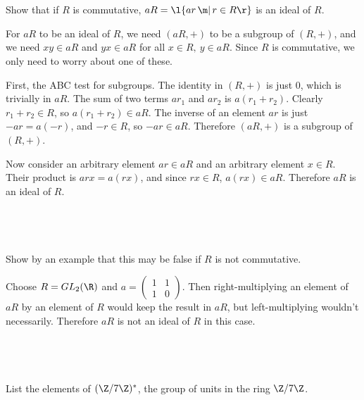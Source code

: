 \documentclass[a4paper]{article}
\begin{document}
\subsection{~} %

\begin{questionbody}
Show that if $R$ is commutative, $aR = \l\{ar \,\m|\, r \in R\r\}$ is an ideal of $R$.
\end{questionbody}

For $aR$ to be an ideal of $R$, we need $(aR, +)$ to be a subgroup of $(R, +)$, and we need $xy \in aR$ and $yx \in aR$ for all $x \in R,\ y \in aR$. Since $R$ is commutative, we only need to worry about one of these.

First, the ABC test for subgroups. The identity in $(R, +)$ is just $0$, which is trivially in $aR$. The sum of two terms $ar_1$ and $ar_2$ is $a(r_1 + r_2)$. Clearly $r_1 + r_2 \in R$, so $a(r_1 + r_2) \in aR$. The inverse of an element $ar$ is just $-ar = a(-r)$, and $-r \in R$, so $-ar \in aR$. Therefore $(aR, +)$ is a subgroup of $(R, +)$.

Now consider an arbitrary element $ar \in aR$ and an arbitrary element $x \in R$. Their product is $arx = a(rx)$, and since $rx \in R$, $a(rx) \in aR$. Therefore $aR$ is an ideal of $R$.

\subsection{~} %

\begin{questionbody}
Show by an example that this may be false if $R$ is not commutative.
\end{questionbody}

Choose $R = GL_2(\R)$ and $a = \begin{pmatrix}1 & 1\\ 1 & 0\end{pmatrix}$. Then right-multiplying an element of $aR$ by an element of $R$ would keep the result in $aR$, but left-multiplying wouldn't necessarily. Therefore $aR$ is not an ideal of $R$ in this case.


\subsection{~} %

\begin{questionbody}
List the elements of $(\Z / 7\Z)^*$, the group of units in the ring $\Z / 7\Z$.
\end{questionbody}
\end{document}
